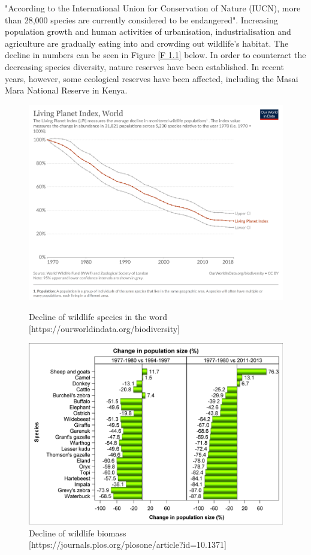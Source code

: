 \documentclass{mcmthesis}
\numberwithin{figure}{section}
\numberwithin{table}{section}
\numberwithin{equation}{section}
\begin{document}
"According to the International Union for Conservation of Nature (IUCN), more than 28,000 species are currently considered to be endangered". Increasing population growth and human activities of urbanisation, industrialisation and agriculture are gradually eating into and crowding out wildlife's habitat. The decline in numbers can be seen in Figure \ref{F 1.1} below. In order to counteract the decreasing species diversity, nature reserves have been established. In recent years, however, some ecological reserves have been affected, including the Masai Mara National Reserve in Kenya.

\begin{figure}[htp]
	\centering
	\begin{minipage}[t]{0.48\linewidth}
	\centering
	\includegraphics[width=0.7\linewidth]{"figures/F 1.1"}
	\caption{Decline of wildlife species in the word [https://ourworldindata.org/biodiversity]}
	\label{F 1.1}
\end{minipage}\hfill
	\begin{minipage}[t]{0.48\linewidth}
\centering
\includegraphics[width=0.7\linewidth]{"figures/F 1.2"}
\caption{Decline of wildlife biomass
		[https://journals.plos.org/plosone/article?id=10.1371]}
\label{F 1.2}
\end{minipage}\hfill
\end{figure}
\end{document}

